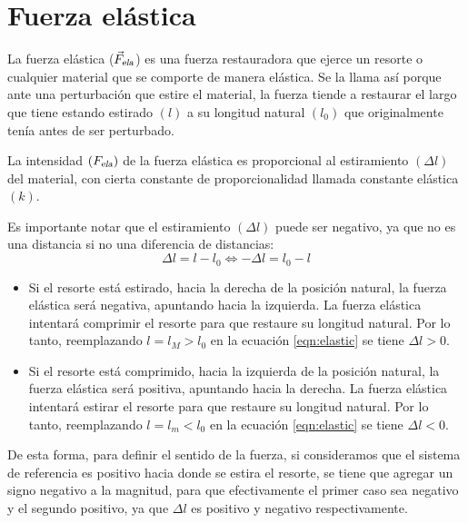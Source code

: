 \documentclass[a5paper,12pt,twoside]{book}
\begin{document}
\section{Fuerza elástica}
\label{sec:elasticForce}

La fuerza elástica (${{\Vec{F}}_\textsl{{ela}}}$) es una fuerza restauradora que ejerce un resorte o cualquier material que se comporte de manera elástica. Se la llama así porque ante una perturbación que estire el material, la fuerza tiende a restaurar el largo que tiene estando estirado $(l)$ a su longitud natural $(l_0)$ que originalmente tenía antes de ser perturbado.

La intensidad $({{F}_\textsl{{ela}}})$ de la fuerza elástica es proporcional al estiramiento $(\Delta l)$ del material, con cierta constante de proporcionalidad llamada constante elástica $(k)$.

\begin{center}
    \vspace{-2cm}
    \def\svgwidth{0.7\linewidth}
    
    \vspace{-2cm}
\end{center}

Es importante notar que el estiramiento $(\Delta l)$ puede ser negativo, ya que no es una distancia si no una diferencia de distancias:
\begin{equation}
    \Delta l = l-l_0 \iff -\Delta l = l_0-l
    \label{eqn:elastic}
\end{equation}

\begin{itemize}
    \item Si el resorte está estirado, hacia la derecha de la posición natural, la fuerza elástica será negativa, apuntando hacia la izquierda. La fuerza elástica intentará comprimir el resorte para que restaure su longitud natural. Por lo tanto, reemplazando $l=l_M>l_0$ en la ecuación \ref{eqn:elastic} se tiene $\Delta l>0$.
    
    \item Si el resorte está comprimido, hacia la izquierda de la posición natural, la fuerza elástica será positiva, apuntando hacia la derecha. La fuerza elástica intentará estirar el resorte para que restaure su longitud natural. Por lo tanto, reemplazando $l=l_m<l_0$ en la ecuación \ref{eqn:elastic} se tiene $\Delta l<0$.
\end{itemize}

De esta forma, para definir el sentido de la fuerza, si consideramos que el sistema de referencia es positivo hacia donde se estira el resorte, se tiene que agregar un signo negativo a la magnitud, para que efectivamente el primer caso sea negativo y el segundo positivo, ya que $\Delta l$ es positivo y negativo respectivamente.
\end{document}
